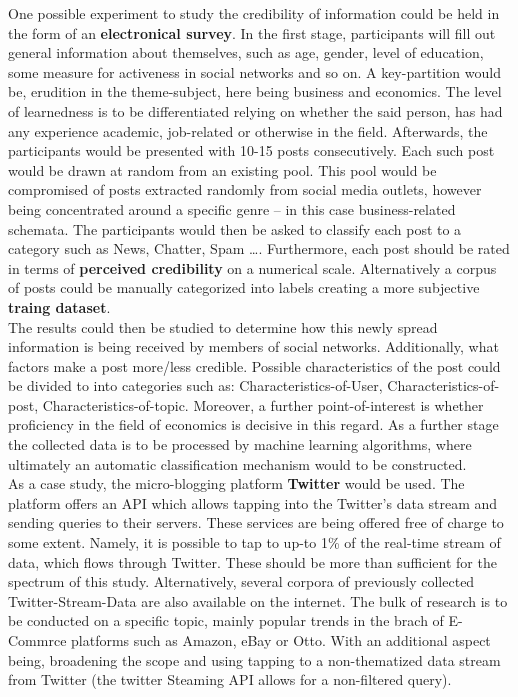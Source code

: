 \documentclass[12pt]{article}
\begin{document}
One possible experiment to study the credibility of information could be held in the form of an \textbf{electronical survey}. In the first stage, participants will fill out general information about themselves, such as age, gender, level of education, some measure for activeness in social networks and so on. A key-partition would be, erudition in the theme-subject, here being business and economics. The level of learnedness is to be differentiated relying on whether the said person, has had any experience academic, job-related or otherwise in the field. Afterwards, the participants would be presented with 10-15 posts consecutively. Each such post would be drawn at random from an existing pool. This pool would be compromised of posts extracted randomly from social media outlets, however being concentrated around a specific genre – in this case business-related schemata. The participants would then be asked to classify each post to a category such as {News, Chatter, Spam …}. Furthermore, each post should be rated in terms of \textbf{perceived credibility} on a numerical scale.  Alternatively a corpus of posts could be manually categorized into labels creating a more subjective \textbf{traing dataset}.
\\

The results could then be studied to determine how this newly spread information is being received by members of social networks. Additionally, what factors make a post more/less credible. Possible characteristics of the post could be divided to into categories such as: Characteristics-of-User, Characteristics-of-post, Characteristics-of-topic. Moreover, a further point-of-interest is whether proficiency in the field of economics is decisive in this regard. As a further stage the collected data is to be processed by machine learning algorithms, where ultimately an automatic classification mechanism would to be constructed.
\\

As a case study, the micro-blogging platform \textbf{Twitter} would be used. The platform offers an API which allows tapping into the Twitter’s data stream and sending queries to their servers. These services are being offered free of charge to some extent. Namely, it is possible to tap to up-to 1\% of the real-time stream of data, which flows through Twitter. These should be more than sufficient for the spectrum of this study. Alternatively, several corpora of previously collected Twitter-Stream-Data are also available on the internet. The bulk of research is to be conducted on  a specific topic, mainly popular trends in the brach of E-Commrce platforms such as Amazon, eBay or Otto. With an additional aspect being, broadening the scope and using tapping to a non-thematized data stream from Twitter (the twitter Steaming API allows for a non-filtered query).
\\
\end{document}
